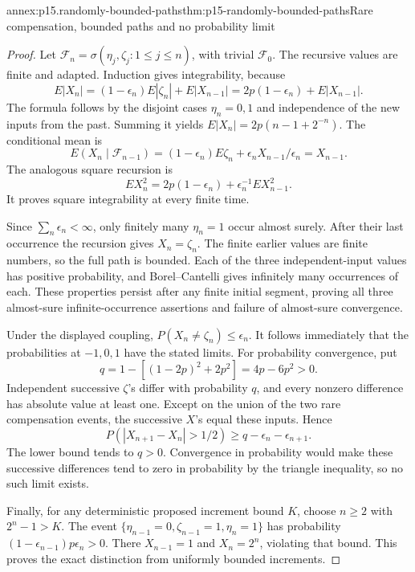 \begin{annexitem}{annex:p15.randomly-bounded-paths}{thm:p15-randomly-bounded-paths}{Rare compensation, bounded paths and no probability limit}
\begin{proof}
Let \(\mathcal F_n=\sigma(\eta_j,\zeta_j:1\leq j\leq n)\),
with trivial \(\mathcal F_0\).
The recursive values are finite and adapted.
Induction gives integrability, because
\[
                 E|X_n|=(1-\epsilon_n)E|\zeta_n|+E|X_{n-1}|
                               =2p(1-\epsilon_n)+E|X_{n-1}|.
\]
The formula follows by the disjoint cases \(\eta_n=0,1\)
and independence of the new inputs from the past.
Summing it yields
\(E|X_n|=2p(n-1+2^{-n})\).
The conditional mean is
\[
 E(X_n\mid\mathcal F_{n-1})
        =(1-\epsilon_n)E\zeta_n
                       +\epsilon_nX_{n-1}/\epsilon_n=X_{n-1}.
\]
The analogous square recursion is
\[
                        EX_n^2=2p(1-\epsilon_n)
                                             +\epsilon_n^{-1}EX_{n-1}^2.
\]
It proves square integrability at every finite time.

Since \(\sum_n\epsilon_n<\infty\), only finitely many
\(\eta_n=1\) occur almost surely.
After their last occurrence the recursion gives \(X_n=\zeta_n\).
The finite earlier values are finite numbers, so the full path
is bounded. Each of the three independent-input values has
positive probability, and Borel--Cantelli gives infinitely
many occurrences of each. These properties persist after
any finite initial segment, proving all three almost-sure
infinite-occurrence assertions and failure of almost-sure convergence.

Under the displayed coupling, \(P(X_n\ne\zeta_n)\leq\epsilon_n\).
It follows immediately that the probabilities at \(-1,0,1\)
have the stated limits.
For probability convergence, put
\[
                         q=1-[(1-2p)^2+2p^2]=4p-6p^2>0.
\]
Independent successive \(\zeta\)'s differ with probability \(q\),
and every nonzero difference has absolute value at least one.
Except on the union of the two rare compensation events,
the successive \(X\)'s equal these inputs. Hence
\[
                  P(|X_{n+1}-X_n|>1/2)
                                   \geq q-\epsilon_n-\epsilon_{n+1}.
\]
The lower bound tends to \(q>0\).
Convergence in probability would make these successive
differences tend to zero in probability by the triangle inequality,
so no such limit exists.

Finally, for any deterministic proposed increment bound \(K\),
choose \(n\geq2\) with \(2^n-1>K\).
The event \(\{\eta_{n-1}=0,\zeta_{n-1}=1,\eta_n=1\}\)
has probability \((1-\epsilon_{n-1})p\epsilon_n>0\).
There \(X_{n-1}=1\) and \(X_n=2^n\), violating that bound.
This proves the exact distinction from uniformly bounded increments.
\end{proof}
\end{annexitem}

